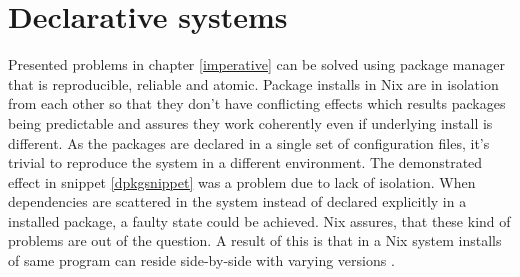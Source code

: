 



\section{Declarative systems} \label{declarativesystems}

Presented problems in chapter \ref{imperative} can be solved using
package manager that is reproducible, reliable and atomic. Package
installs in Nix are in isolation from each other so that they don't
have conflicting effects which results packages being predictable and
assures they work coherently even if underlying install is
different. As the packages are declared in a single set of
configuration files, it's trivial to reproduce the system in a
different environment. The demonstrated effect in snippet
\ref{dpkgsnippet} was a problem due to lack of isolation. When
dependencies are scattered in the system instead of declared
explicitly in a installed package, a faulty state could be
achieved. Nix assures, that these kind of problems are out of the
question. A result of this is that in a Nix system installs of same
program can reside side-by-side with varying versions
\cite{dolstra2008nixos}.

